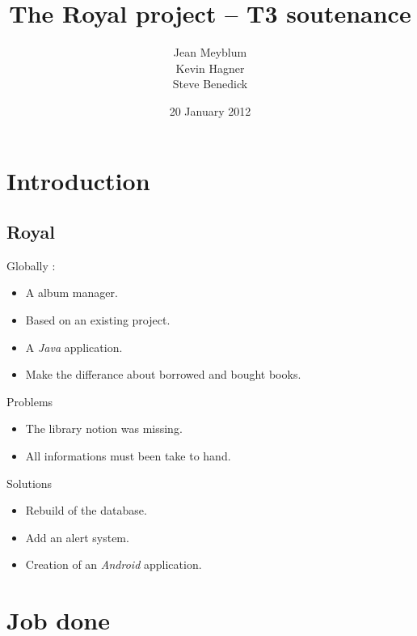 \documentclass{beamer}
\title[T3 soutenance -- T306AMOA]{The Royal project -- T3 soutenance}
\author[Jean, Kevin \& Steve]{Jean Meyblum \\ Kevin Hagner \\ Steve Benedick}
\institute{IUT Robert Schuman}
\date{20 January 2012}
\begin{document}
\section{Introduction}
\subsection{Royal}
\begin{frame}
\titlepage
\end{frame}

\begin{frame}
\begin{center}
Globally : 
\begin{itemize}
\pause \item A album manager.
\pause \item Based on an existing project.
\pause \item A \emph{Java} application.
\pause \item Make the differance about borrowed and bought books. 
\end{itemize}
\end{center}
\end{frame}

\begin{frame}
\begin{block}{Problems}
\begin{itemize}
\pause \item The library notion was missing.
\pause \item All informations must been take to hand.
\end{itemize}
\end{block}
\pause 
\begin{block}{Solutions}
\begin{itemize}
\pause \item Rebuild of the database.
\pause \item Add an alert system.
\pause \item Creation of an \emph{Android} application.
\end{itemize}
\end{block}
\end{frame}

\section{Job done}
\end{document}
